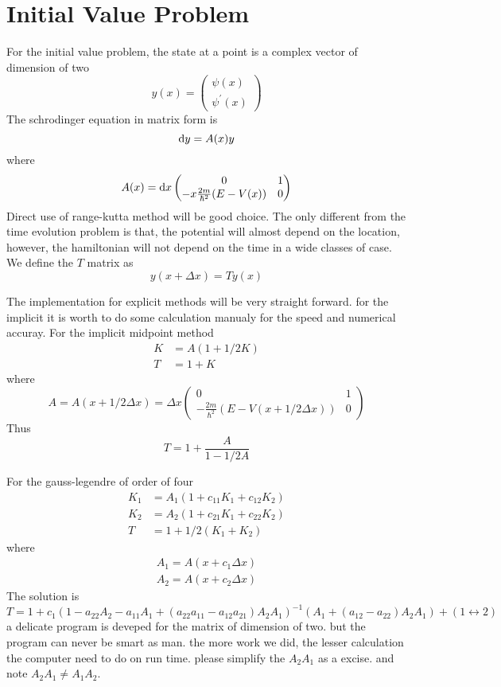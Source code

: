 \documentclass[12pt,twoside]{article}
\def\df{{\rm d}}
\begin{document}
\section{Initial Value Problem}
For the initial value problem, the state at a point is a complex vector of dimension of two
$$
y(x)=\begin{pmatrix} \psi(x) \\ \psi^\prime(x) \end{pmatrix}
$$
The schrodinger equation in matrix form is
$$
\df y = A(x) y
$$
where
$$
A(x)=\df x\begin{pmatrix}  0 & 1 \\ -x\frac{2m}{\hbar^2}(E-V(x)) & 0 \end{pmatrix}
$$
Direct use of range-kutta method will be good choice.
The only different from the time evolution problem is that, the potential will almost depend on the location, however, the hamiltonian will not depend on the time in a wide classes of case.
We define the $T$ matrix as
$$
y(x +\Delta x) = T y(x)
$$

The implementation for explicit methods will be very straight forward. for the implicit it is worth to do some calculation manualy for the speed and numerical accuray.
For the implicit midpoint method
\begin{align*}
K &= A(1 + 1/2K)\\
T &= 1 + K
\end{align*}
where
$$
A = A(x+1/2\Delta x) =\Delta x \begin{pmatrix}  0 & 1 \\ -\frac{2m}{\hbar^2}(E-V(x+1/2\Delta x)) & 0 \end{pmatrix}
$$
Thus
$$
T = 1 + \frac{A}{1 - 1/2A}
$$

For the gauss-legendre of order of four
\begin{align*}
K_1 &= A_1(1 + c_{11} K_1 + c_{12} K_2)\\
K_2 &= A_2(1 + c_{21} K_1 + c_{22} K_2)\\
T &= 1 + 1/2(K_1+K_2)
\end{align*}
where
\begin{align*}
A_1 = A(x + c_1\Delta x)\\
A_2 = A(x + c_2\Delta x)
\end{align*}
The solution is
$$
T = 1 + c_1 (1 - a_{22} A_2 - a_{11} A_1 + (a_{22} a_{11} - a_{12} a_{21})A_2 A_1)^{-1}(A_1+(a_{12}-a_{22})A_2A_1) + (1\leftrightarrow 2)
$$
a delicate program is deveped for the matrix of dimension of two. but the program can never be smart as man. the more work we did, the lesser calculation the computer need to do on run time. please simplify the $A_2A_1$ as a excise. and note $A_2A_1\neq A_1A_2$.
\end{document}
